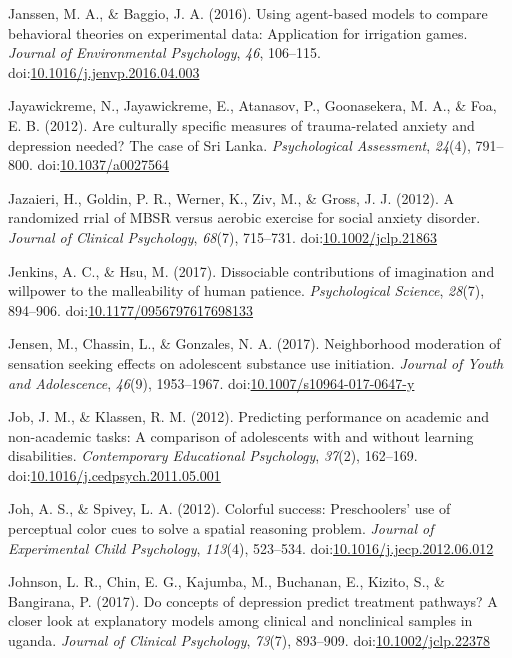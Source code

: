 \documentclass[english,man]{apa6}
\theoremstyle{definition}
\theoremstyle{definition}
\theoremstyle{definition}
\theoremstyle{remark}
\begin{document}
\hypertarget{ref-Janssen2016}{}
Janssen, M. A., \& Baggio, J. A. (2016). Using agent-based models to
compare behavioral theories on experimental data: Application for
irrigation games. \emph{Journal of Environmental Psychology}, \emph{46},
106--115.
doi:\href{https://doi.org/10.1016/j.jenvp.2016.04.003}{10.1016/j.jenvp.2016.04.003}

\hypertarget{ref-Jayawickreme2012}{}
Jayawickreme, N., Jayawickreme, E., Atanasov, P., Goonasekera, M. A., \&
Foa, E. B. (2012). Are culturally specific measures of trauma-related
anxiety and depression needed? The case of Sri Lanka.
\emph{Psychological Assessment}, \emph{24}(4), 791--800.
doi:\href{https://doi.org/10.1037/a0027564}{10.1037/a0027564}

\hypertarget{ref-Jazaieri2012}{}
Jazaieri, H., Goldin, P. R., Werner, K., Ziv, M., \& Gross, J. J.
(2012). A randomized rrial of MBSR versus aerobic exercise for social
anxiety disorder. \emph{Journal of Clinical Psychology}, \emph{68}(7),
715--731.
doi:\href{https://doi.org/10.1002/jclp.21863}{10.1002/jclp.21863}

\hypertarget{ref-Jenkins2017}{}
Jenkins, A. C., \& Hsu, M. (2017). Dissociable contributions of
imagination and willpower to the malleability of human patience.
\emph{Psychological Science}, \emph{28}(7), 894--906.
doi:\href{https://doi.org/10.1177/0956797617698133}{10.1177/0956797617698133}

\hypertarget{ref-Jensen2017}{}
Jensen, M., Chassin, L., \& Gonzales, N. A. (2017). Neighborhood
moderation of sensation seeking effects on adolescent substance use
initiation. \emph{Journal of Youth and Adolescence}, \emph{46}(9),
1953--1967.
doi:\href{https://doi.org/10.1007/s10964-017-0647-y}{10.1007/s10964-017-0647-y}

\hypertarget{ref-Job2012}{}
Job, J. M., \& Klassen, R. M. (2012). Predicting performance on academic
and non-academic tasks: A comparison of adolescents with and without
learning disabilities. \emph{Contemporary Educational Psychology},
\emph{37}(2), 162--169.
doi:\href{https://doi.org/10.1016/j.cedpsych.2011.05.001}{10.1016/j.cedpsych.2011.05.001}

\hypertarget{ref-Joh2012}{}
Joh, A. S., \& Spivey, L. A. (2012). Colorful success: Preschoolers' use
of perceptual color cues to solve a spatial reasoning problem.
\emph{Journal of Experimental Child Psychology}, \emph{113}(4),
523--534.
doi:\href{https://doi.org/10.1016/j.jecp.2012.06.012}{10.1016/j.jecp.2012.06.012}

\hypertarget{ref-Johnson2017}{}
Johnson, L. R., Chin, E. G., Kajumba, M., Buchanan, E., Kizito, S., \&
Bangirana, P. (2017). Do concepts of depression predict treatment
pathways? A closer look at explanatory models among clinical and
nonclinical samples in uganda. \emph{Journal of Clinical Psychology},
\emph{73}(7), 893--909.
doi:\href{https://doi.org/10.1002/jclp.22378}{10.1002/jclp.22378}
\end{document}
